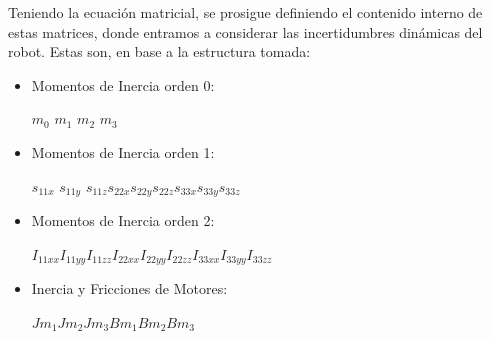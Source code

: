 Teniendo la ecuación matricial, se prosigue definiendo el contenido interno de estas matrices, donde entramos a considerar las incertidumbres dinámicas del robot. Estas son, en base a la estructura tomada:
\vspace{0.3cm}

\begin{itemize}
	\item Momentos de Inercia orden 0:
		\begin{center}
		$ m_0$ \hspace{0.2cm} $m_1$\hspace{0.2cm} $m_2$ \hspace{0.2cm}$m_3$
		\end{center}
	\item Momentos de Inercia orden 1:
		\begin{center}
		$ s_{11x}$\hspace{0.2cm} $s_{11y}$\hspace{0.2cm} $s_{11z}$\hspace{0.2cm}$ s_{22x}$\hspace{0.2cm}$ s_{22y}$\hspace{0.2cm}$ s_{22z}$\hspace{0.2cm}$ s_{33x}$\hspace{0.2cm}$ s_{33y}$\hspace{0.2cm}$ s_{33z} $
	\end{center}
	\item Momentos de Inercia orden 2:
		\begin{center}
		$ I_{11xx} $\hspace{0.2cm}$I_{11yy}$\hspace{0.2cm}$ I_{11zz}$\hspace{0.2cm}$ I_{22xx}$\hspace{0.2cm}$ I_{22yy}$\hspace{0.2cm}$ I_{22zz}$\hspace{0.2cm}$ I_{33xx}$\hspace{0.2cm}$ I_{33yy}$\hspace{0.2cm}$ I_{33zz} $
	\end{center}
	\item Inercia y Fricciones de Motores:
	\begin{center}
		$Jm_1$\hspace{0.2cm}$ Jm_2 $\hspace{0.2cm}$Jm_3$\hspace{0.2cm}$ Bm_1$\hspace{0.2cm}$ Bm_2$\hspace{0.2cm}$ Bm_3$
	\end{center}
\end{itemize}

